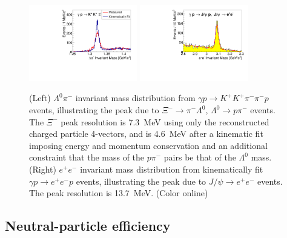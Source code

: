 \begin{figure}[tpb]
\begin{center}
\includegraphics[width=0.42\textwidth]{figures/XimMass_2017-ver30.pdf}
\includegraphics[width=0.42\textwidth]{figures/jpsi_mass.pdf}
\caption{\label{fig:invmass2}
(Left) $\Lambda^0\pi^-$ invariant mass distribution from $\gamma p \to K^+ K^+ \pi^- \pi^- p$ events, illustrating the peak due to $\Xi^- \to \pi^- \Lambda^0$, $\Lambda^0 \to p \pi^-$ events.  The $\Xi^-$ peak resolution is 7.3~MeV using only the reconstructed charged particle 4-vectors, and is 4.6~MeV after a kinematic fit imposing energy and momentum conservation and an additional constraint that the mass of the $p \pi^-$ pairs be that of the $\Lambda^0$ mass.  (Right) $e^+e^-$ invariant mass distribution from kinematically fit $\gamma p \to e^+e^- p$ events, illustrating the peak due to $J/\psi\to e^+e^-$ events.  The peak resolution is 13.7~MeV. (Color online)}
\end{center}
\end{figure}

\subsection{Neutral-particle efficiency\label{sec:perfneutral}}



